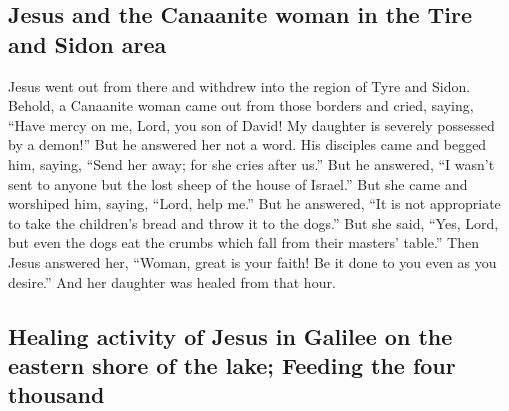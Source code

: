 \hypertarget{jesus-and-the-canaanite-woman-in-the-tire-and-sidon-area}{%
\subsection{Jesus and the Canaanite woman in the Tire and Sidon
area}\label{jesus-and-the-canaanite-woman-in-the-tire-and-sidon-area}}

 Jesus went out from there and withdrew into the region
of Tyre and Sidon.  Behold, a Canaanite woman came out
from those borders and cried, saying, ``Have mercy on me, Lord, you son
of David! My daughter is severely possessed by a demon!''
 But he answered her not a word. His disciples came and
begged him, saying, ``Send her away; for she cries after us.''
 But he answered, ``I wasn't sent to anyone but the lost
sheep of the house of Israel.''  But she came and
worshiped him, saying, ``Lord, help me.''  But he
answered, ``It is not appropriate to take the children's bread and throw
it to the dogs.''  But she said, ``Yes, Lord, but even
the dogs eat the crumbs which fall from their masters' table.''
 Then Jesus answered her, ``Woman, great is your faith!
Be it done to you even as you desire.'' And her daughter was healed from
that hour.

\hypertarget{healing-activity-of-jesus-in-galilee-on-the-eastern-shore-of-the-lake-feeding-the-four-thousand}{%
\subsection{Healing activity of Jesus in Galilee on the eastern shore of
the lake; Feeding the four
thousand}\label{healing-activity-of-jesus-in-galilee-on-the-eastern-shore-of-the-lake-feeding-the-four-thousand}}

